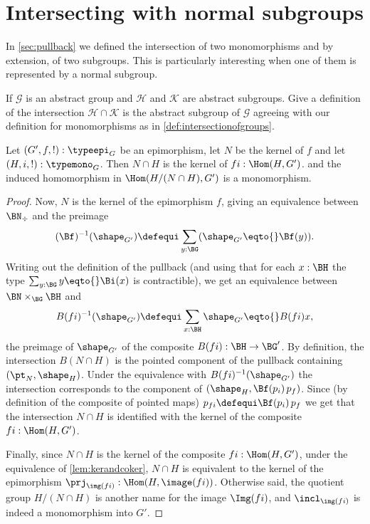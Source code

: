 \section{Intersecting with normal subgroups}
In \cref{sec:pullback} we defined the intersection of two monomorphisms and by extension, of two subgroups.  This is particularly interesting when one of them is represented by a normal subgroup.
\begin{xca}
  If $\mathcal G$ is an abstract group and $\mathcal H$ and $\mathcal K$ are abstract subgroups.  Give a definition of the intersection $\mathcal H\cap\mathcal K$ is the abstract subgroup of $\mathcal G$ agreeing with our definition for monomorphisms as in \cref{def:intersectionofgroups}.
\end{xca}
\begin{lemma}
  \label{lem:whatSylow2needs}
  Let $(G',f,!):\typeepi_G$ be an epimorphism, let $N$ be the kernel of $f$  and let $(H,i,!):\typemono_G$.
  Then
$N\cap H$ is the kernel of $fi:\Hom(H,G')$. 
and the induced homomorphism in $\Hom(H/(N\cap H),G')$ is a monomorphism.
  \begin{proof}
Now, $N$ is the kernel of the epimorphism $f$, giving an equivalence between $\BN_\div$ and the preimage
$$(\Bf)^{-1}(\shape_{G'})\defequi\sum_{y:\BG}(\shape_{G'}\eqto{}\Bf(y)).$$
Writing out the definition of the pullback (and using that for each $x:\BH$ the type $\sum_{y:\BG}y\eqto{}\Bi(x)$ is contractible), we get an equivalence between $\BN\times_{\BG}\BH$ and
$$B(fi)^{-1}(\shape_{G'})\defequi\sum_{x:\BH}\shape_{G'}\eqto{}B(fi)x,$$
the preimage of $\shape_{G'}$ of the composite $B(fi):\BH\to \BG'$.
 By definition, the intersection $B(N\cap H)$ is the pointed component of the pullback containing $(\pt_N,\shape_H)$.  Under the equivalence with $B(fi)^{-1}(\shape_{G'})$ the intersection corresponds to the component of $(\shape_H,\Bf(p_i)\,p_f)%
 $.
Since (by definition of the composite of pointed maps) $p_{fi}\defequi \Bf(p_i)\,p_f$ we get that the intersection $N\cap H$ is identified with the kernel of the composite $fi:\Hom(H,G')$.

Finally, since $N\cap H$ is the kernel of the composite $fi:\Hom(H,G')$, under the equivalence of \cref{lem:kerandcoker}, $N\cap H$ is equivalent to the kernel of the epimorphism $\prj_{\img(fi)}:\Hom(H,\image (fi))$.  Otherwise said, the quotient group $H/(N\cap H)$ is another name for the image $\Img (fi)$, and $\incl_{\img(fi)}$ is indeed a monomorphism into $G'$.
  \end{proof}
\end{lemma}
